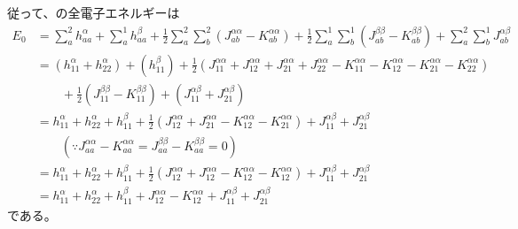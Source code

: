 従って、の全電子エネルギーは
\begin{align}
	E_0
&=
	\sum_a^{2}
		h^\alpha_{aa}
	+
	\sum_a^{1}
		h^\beta_{aa}
	+
	\frac{1}{2}
	\sum_a^{2}
	\sum_b^{2}\left(
		J^{\alpha\alpha}_{ab}
		-
		K^{\alpha\alpha}_{ab}
	\right)
	+
	\frac{1}{2}
	\sum_a^{1}
	\sum_b^{1}\left(
		J^{\beta\beta}_{ab}
		-
		K^{\beta\beta}_{ab}
	\right)
	+
	\sum_a^{2}
	\sum_b^{1}
		J^{\alpha\beta}_{ab} \\
%
%
&=
	\left(
		h^\alpha_{11}
		+
		h^\alpha_{22}
	\right)
	+
	\left(
		h^\beta_{11}
	\right)
	+
	\frac{1}{2}
	\left(
		J^{\alpha\alpha}_{11}
		+
		J^{\alpha\alpha}_{12}
		+
		J^{\alpha\alpha}_{21}
		+
		J^{\alpha\alpha}_{22}
		-
		K^{\alpha\alpha}_{11}
		-
		K^{\alpha\alpha}_{12}
		-
		K^{\alpha\alpha}_{21}
		-
		K^{\alpha\alpha}_{22}
	\right) \nonumber \\ &\qquad
	+
	\frac{1}{2}
	\left(
		J^{\beta\beta}_{11}
		-
		K^{\beta\beta}_{11}
	\right)
	+
	\left(
		J^{\alpha\beta}_{11}
		+
		J^{\alpha\beta}_{21}
	\right) \\
%
%
&=
	h^\alpha_{11}
	+
	h^\alpha_{22}
	+
	h^\beta_{11}
	+
	\frac{1}{2}
	\left(
		J^{\alpha\alpha}_{12}
		+
		J^{\alpha\alpha}_{21}
		-
		K^{\alpha\alpha}_{12}
		-
		K^{\alpha\alpha}_{21}
	\right)
	+
	J^{\alpha\beta}_{11}
	+
	J^{\alpha\beta}_{21} \nonumber \\ &\qquad
	(\because
		J^{\alpha\alpha}_{aa}-K^{\alpha\alpha}_{aa}
		=
		J^{\beta\beta}_{aa}-K^{\beta\beta}_{aa}
		=0
	) \\
%
%
&=
	h^\alpha_{11}
	+
	h^\alpha_{22}
	+
	h^\beta_{11}
	+
	\frac{1}{2}
	\left(
		J^{\alpha\alpha}_{12}
		+
		J^{\alpha\alpha}_{12}
		-
		K^{\alpha\alpha}_{12}
		-
		K^{\alpha\alpha}_{12}
	\right)
	+
	J^{\alpha\beta}_{11}
	+
	J^{\alpha\beta}_{21} \\
%
%
&=
	h^\alpha_{11}
	+
	h^\alpha_{22}
	+
	h^\beta_{11}
	+
	J^{\alpha\alpha}_{12}
	-
	K^{\alpha\alpha}_{12}
	+
	J^{\alpha\beta}_{11}
	+
	J^{\alpha\beta}_{21}
\end{align}
である。


